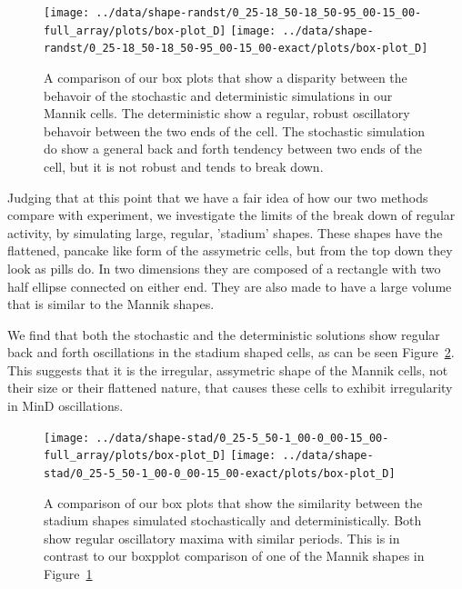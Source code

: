 \documentclass[letterpaper,twocolumn,amsmath,amssymb,pre]{revtex4-1}
\begin{document}
\begin{figure}
  \texttt{[image: ../data/shape-randst/0\_25-18\_50-18\_50-95\_00-15\_00-full\_array/plots/box-plot\_D]}
  \texttt{[image: ../data/shape-randst/0\_25-18\_50-18\_50-95\_00-15\_00-exact/plots/box-plot\_D]}
  \caption{A comparison of our box plots that show a disparity between
    the behavoir of the stochastic and deterministic simulations in
    our Mannik cells.  The deterministic show a regular, robust
    oscillatory behavoir between the two ends of the cell. The
    stochastic simulation do show a general back and forth tendency
    between two ends of the cell, but it is not robust and tends to
    break down.}
  \label{box-mannik}
\end{figure}

Judging that at this point that we have a fair idea of how our two
methods compare with experiment, we investigate the limits of the
break down of regular activity, by simulating large, regular,
'stadium' shapes.  These shapes have the flattened, pancake like form
of the assymetric cells, but from the top down they look as pills
do. In two dimensions they are composed of a rectangle with two half
ellipse connected on either end.  They are also made to have a large
volume that is similar to the Mannik shapes.

We find that both the stochastic and the deterministic solutions show
regular back and forth oscillations in the stadium shaped cells, as
can be seen Figure~\ref{box-stadium}.  This suggests that it is the
irregular, assymetric shape of the Mannik cells, not their size or
their flattened nature, that causes these cells to exhibit
irregularity in MinD oscillations.

\begin{figure}
  \texttt{[image: ../data/shape-stad/0\_25-5\_50-1\_00-0\_00-15\_00-full\_array/plots/box-plot\_D]}
  \texttt{[image: ../data/shape-stad/0\_25-5\_50-1\_00-0\_00-15\_00-exact/plots/box-plot\_D]}
  \caption{A comparison of our box plots that show the similarity
    between the stadium shapes simulated stochastically and
    deterministically.  Both show regular oscillatory maxima with
    similar periods.  This is in contrast to our boxpplot comparison
    of one of the Mannik shapes in Figure~\ref{box-mannik}}
  \label{box-stadium}
\end{figure}
\end{document}
